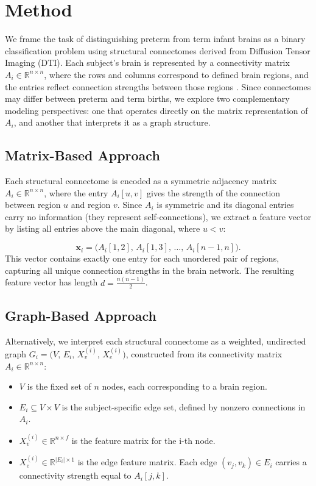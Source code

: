 \documentclass[doubleblind]{ecai}
\begin{document}
\section{Method}

We frame the task of distinguishing preterm from term infant brains as a binary classification problem using structural connectomes derived from Diffusion Tensor Imaging (DTI). Each subject’s brain is represented by a connectivity matrix $A_i \in \mathbb{R}^{n \times n}$, where the rows and columns correspond to defined brain regions, and the entries reflect connection strengths between those regions \cite{taoudi2022predicting}. Since connectomes may differ between preterm and term births, we explore two complementary modeling perspectives: one that operates directly on the matrix representation of $A_i$, and another that interprets it as a graph structure.



\subsection{Matrix-Based Approach}

Each structural connectome is encoded as a symmetric adjacency matrix $A_i \in \mathbb{R}^{n \times n}$, where the entry $A_i[u, v]$ gives the strength of the connection between region $u$ and region $v$. Since $A_i$ is symmetric and its diagonal entries carry no information (they represent self-connections), we extract a feature vector by listing all entries above the main diagonal, where $u < v$:

\begin{equation}
    \mathbf{x}_i = \bigl(A_i[1,2],\, A_i[1,3],\, \dots,\, A_i[n-1,n]\bigr).
\end{equation}
This vector contains exactly one entry for each unordered pair of regions, capturing all unique connection strengths in the brain network. The resulting feature vector has length $d = \frac{n(n-1)}{2}$.

\subsection{Graph-Based Approach}

Alternatively, we interpret each structural connectome as a weighted, undirected graph $G_i = \bigl(V,\,E_i,\,X_v^{(i)},\,X_e^{(i)}\bigr)$, constructed from its connectivity matrix $A_i \in \mathbb{R}^{n \times n}$:

\begin{itemize}
    \item $V$ is the fixed set of $n$ nodes, each corresponding to a brain region.
    \item $E_i \subseteq V \times V$ is the subject-specific edge set, defined by nonzero connections in $A_i$.
    \item $X_v^{(i)} \in \mathbb{R}^{n \times f}$ is the feature matrix for the i-th node.
    \item $X_e^{(i)} \in \mathbb{R}^{|E_i| \times 1}$ is the edge feature matrix. Each edge $(v_j, v_k) \in E_i$ carries a connectivity strength equal to $A_i[j,k]$.
\end{itemize}
\end{document}
